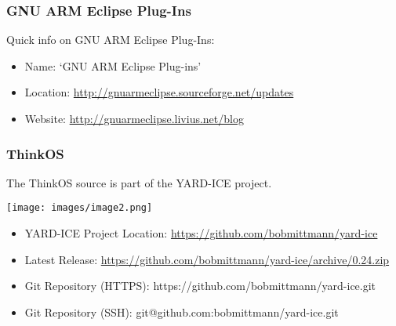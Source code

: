 \subsubsection{\texorpdfstring{{GNU ARM Eclipse
Plug-Ins}}{GNU ARM Eclipse Plug-Ins}}\label{gnu-arm-eclipse-plug-ins}

{Quick info on GNU ARM Eclipse Plug-Ins:}

\begin{itemize}
\tightlist
\item
  {Name: `}{GNU ARM Eclipse Plug-ins}{'}
\item
  {Location:
  }{\href{https://www.google.com/url?q=http://gnuarmeclipse.sourceforge.net/updates\&sa=D\&ust=1511275046399000\&usg=AFQjCNEdmX4d-t5pswZkr32N4e9t7J324Q}{http://gnuarmeclipse.sourceforge.net/updates}}
\item
  {Website:
  }{\href{https://www.google.com/url?q=http://gnuarmeclipse.livius.net/blog\&sa=D\&ust=1511275046399000\&usg=AFQjCNHwOOZ7pOFg21RgjhMN2SMiP27Adw}{http://gnuarmeclipse.livius.net/blog}}
\end{itemize}

\subsubsection{\texorpdfstring{{ThinkOS}}{ThinkOS}}\label{h.ajl6qmj6j511}

{The ThinkOS source is part of the YARD-ICE project.}

{\texttt{[image: images/image2.png]}}

\begin{itemize}
\tightlist
\item
  {YARD-ICE Project Location:
  }{\href{https://www.google.com/url?q=https://github.com/bobmittmann/yard-ice\&sa=D\&ust=1511275046400000\&usg=AFQjCNGufoXP2wfG8botuTmr2t7ckLYnvQ}{https://github.com/bobmittmann/yard-ice}}
\item
  {Latest Release:
  }{\href{https://www.google.com/url?q=https://github.com/bobmittmann/yard-ice/archive/0.24.zip\&sa=D\&ust=1511275046401000\&usg=AFQjCNF-nzx-oGprzrbxGIY-uiZXVNkATg}{https://github.com/bobmittmann/yard-ice/archive/0.24.zip}}
\item
  {Git Repository (HTTPS)}{:
  }{https://github.com/bobmittmann/yard-ice.git}
\item
  {Git Repository (SSH): }{git@github.com:bobmittmann/yard-ice.git}
\end{itemize}

{}
